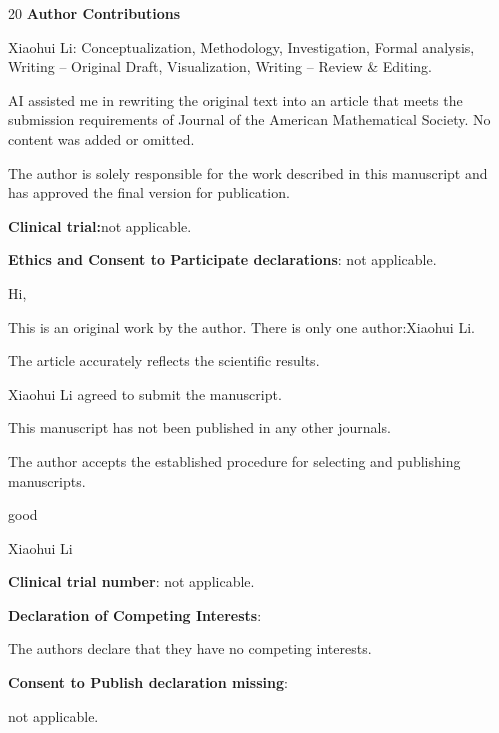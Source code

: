 \documentclass[11pt,a4paper]{article}
\begin{document}
\begin{thebibliography}{20}
 \textbf{\textbf{Author Contributions}}

Xiaohui Li: Conceptualization, Methodology, Investigation, Formal analysis, Writing – Original Draft, Visualization, Writing – Review \& Editing.

AI assisted me in rewriting the original text into an article that meets the submission requirements of Journal of the American Mathematical Society. No content was added or omitted.

 The author is solely responsible for the work described in this manuscript and has approved the final version for publication.

 \textbf{\textbf{Clinical trial:}}not applicable.

 \textbf{\textbf{Ethics and Consent to Participate declarations}}: not applicable.

 Hi,

This is an original work by the author. There is only one author:Xiaohui Li.

The article accurately reflects the scientific results.

Xiaohui Li agreed to submit the manuscript.

This manuscript has not been published in any other journals.

The author accepts the established procedure for selecting and publishing manuscripts.

good

Xiaohui Li



 \textbf{\textbf{Clinical trial number}}: not applicable.
 
 \textbf{\textbf{Declaration of Competing Interests}}: 

The authors declare that they have no competing interests.


\textbf{\textbf{Consent to Publish declaration missing}}: 

not applicable.


\end{thebibliography}
\end{document}
